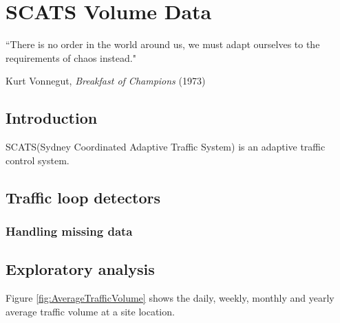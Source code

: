 
\chapter{SCATS Volume Data} %

\label{Chapter3}


``There is no order in the world around us, we must adapt ourselves to the requirements of chaos
instead."

\begin{flushright}
Kurt Vonnegut, \textit{Breakfast of Champions} (1973)
\end{flushright}

\section{Introduction}
SCATS(Sydney Coordinated Adaptive Traffic System) is an adaptive traffic control system.

\section{Traffic loop detectors}

\subsection{Handling missing data}


\section{Exploratory analysis}
Figure \ref{fig:AverageTrafficVolume} shows the daily, weekly, monthly and yearly average traffic
volume at a site
location.

